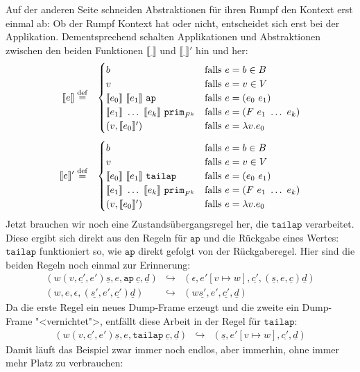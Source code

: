 Auf der anderen Seite schneiden Abstraktionen für ihren Rumpf den
Kontext erst einmal ab: Ob der Rumpf Kontext hat
oder nicht, entscheidet sich erst bei der Applikation.
Dementsprechend schalten Applikationen und Abstraktionen zwischen den
beiden Funktionen $\llbracket \underline{~} \rrbracket$ und
$\llbracket \underline{~} \rrbracket'$ hin und her:
%
\begin{eqnarray*}
  \llbracket e \rrbracket &\stackrel{\rm def}{=}&
  \begin{cases}
    b & \textrm{falls $e = b \in B$}\\
    v & \textrm{falls $e = v \in V$}\\
    \llbracket e_0\rrbracket~\llbracket e_1\rrbracket~\mathtt{ap}
    & \textrm{falls $e = (e_0~e_1)$}\\
    \llbracket e_1\rrbracket~\ldots~\llbracket e_k\rrbracket~\mathtt{prim}_{F^k}
    & \textrm{falls $e = (F~e_1~\ldots~e_k)$}\\
    (v, \llbracket e_0\rrbracket') & \textrm{falls $e = \lambda v.e_0$}
  \end{cases}\\[1ex]
  \llbracket e \rrbracket' &\stackrel{\rm def}{=}&
  \begin{cases}
    b & \textrm{falls $e = b \in B$}\\
    v & \textrm{falls $e = v \in V$}\\
    \llbracket e_0\rrbracket~\llbracket e_1\rrbracket~\mathtt{tailap}
    & \textrm{falls $e = (e_0~e_1)$}\\
    \llbracket e_1\rrbracket~\ldots~\llbracket e_k\rrbracket~\mathtt{prim}_{F^k}
    & \textrm{falls $e = (F~e_1~\ldots~e_k)$}\\
    (v, \llbracket e_0\rrbracket') & \textrm{falls $e = \lambda v.e_0$}
  \end{cases}
\end{eqnarray*}
%
Jetzt brauchen wir
noch eine Zustandsübergangsregel her, die $\mathtt{tailap}$
verarbeitet.  Diese ergibt sich direkt aus den Regeln für
$\mathtt{ap}$ und die Rückgabe eines Wertes:  $\mathtt{tailap}$
funktioniert so, wie $\mathtt{ap}$ direkt gefolgt von der
Rückgaberegel.  Hier sind die beiden Regeln noch einmal zur Erinnerung:
%
\begin{eqnarray*}
   (w (v,\underline{c'}, e') \underline{s}, e, \mathtt{ap}~\underline{c}, \underline{d})
  &\hookrightarrow&
  (\epsilon, e'[v\mapsto w], \underline{c'}, (\underline{s}, e, \underline{c}) \underline{d})
  \\
  (w, e, \epsilon, (\underline{s'}, e', \underline{c'}) \underline{d})
  &\hookrightarrow&
  (w\underline{s'}, e', \underline{c'}, \underline{d})
\end{eqnarray*}
%
Da die erste Regel ein neues Dump-Frame erzeugt und die zweite ein
Dump-Frame "<vernichtet">, entfällt diese Arbeit in der Regel für
$\mathtt{tailap}$:
%
\begin{eqnarray*}
  (w (v,\underline{c'}, e') \underline{s}, e, \mathtt{tailap}~\underline{c}, \underline{d})
  &\hookrightarrow&
  (\underline{s}, e'[v \mapsto w], \underline{c'}, \underline{d})
\end{eqnarray*}
%
Damit läuft das Beispiel zwar immer noch endlos, aber immerhin, ohne
immer mehr Platz zu verbrauchen:

